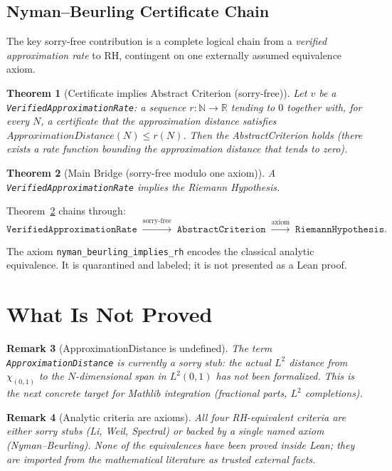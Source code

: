 \documentclass[11pt,a4paper]{article}
\newtheorem{theorem}{Theorem}
\newtheorem{remark}[theorem]{Remark}
\begin{document}
\subsection{Nyman--Beurling Certificate Chain}

The key sorry-free contribution is a complete logical chain from a
\emph{verified approximation rate} to RH, contingent on one externally assumed
equivalence axiom.

\begin{theorem}[Certificate implies Abstract Criterion (sorry-free)]
  Let $v$ be a \texttt{VerifiedApproximationRate}: a sequence $r : \mathbb{N}
  \to \mathbb{R}$ tending to $0$ together with, for every $N$, a certificate
  that the approximation distance satisfies $\mathit{ApproximationDistance}(N)
  \leq r(N)$.  Then the \emph{AbstractCriterion} holds (there exists a rate
  function bounding the approximation distance that tends to zero).
\end{theorem}

\begin{theorem}[Main Bridge (sorry-free modulo one axiom)]
  \label{thm:rh_bridge}
  A \texttt{VerifiedApproximationRate} implies the Riemann Hypothesis.
\end{theorem}

Theorem~\ref{thm:rh_bridge} chains through:
\[
  \texttt{VerifiedApproximationRate}
  \;\xrightarrow{\text{sorry-free}}\;
  \texttt{AbstractCriterion}
  \;\xrightarrow{\text{axiom}}\;
  \texttt{RiemannHypothesis}.
\]

The axiom \texttt{nyman\_beurling\_implies\_rh} encodes the classical analytic
equivalence.  It is quarantined and labeled; it is not presented as a Lean
proof.

\section{What Is Not Proved}

\begin{remark}[ApproximationDistance is undefined]
  The term \texttt{ApproximationDistance} is currently a sorry stub: the
  actual $L^2$ distance from $\chi_{(0,1)}$ to the $N$-dimensional span in
  $L^2(0,1)$ has not been formalized.  This is the next concrete target for
  Mathlib integration (fractional parts, $L^2$ completions).
\end{remark}

\begin{remark}[Analytic criteria are axioms]
  All four RH-equivalent criteria are either sorry stubs (Li, Weil, Spectral)
  or backed by a single named axiom (Nyman--Beurling).  None of the
  equivalences have been proved inside Lean; they are imported from the
  mathematical literature as trusted external facts.
\end{remark}
\end{document}

